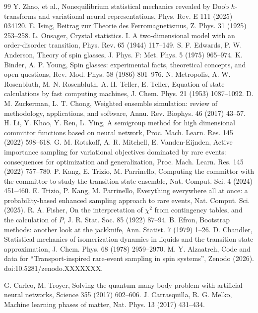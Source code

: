 \documentclass[a4paper,fleqn]{cas-sc}
\begin{document}
\begin{thebibliography}{99}
 Y. Zhao, et al., Nonequilibrium statistical mechanics revealed by Doob
$h$-transforms and variational neural representations, Phys. Rev. E 111 (2025) 034120.
 E. Ising, Beitrag zur Theorie des Ferromagnetismus, Z. Phys. 31 (1925)
253--258.
 L. Onsager, Crystal statistics. I. A two-dimensional model with an
order-disorder transition, Phys. Rev. 65 (1944) 117--149.
 S. F. Edwards, P. W. Anderson, Theory of spin glasses, J. Phys. F: Met.
Phys. 5 (1975) 965--974.
 K. Binder, A. P. Young, Spin glasses: experimental facts, theoretical
concepts, and open questions, Rev. Mod. Phys. 58 (1986) 801--976.
 N. Metropolis, A. W. Rosenbluth, M. N. Rosenbluth, A. H. Teller,
E. Teller, Equation of state calculations by fast computing machines, J. Chem. Phys. 21 (1953)
1087--1092.
 D. M. Zuckerman, L. T. Chong, Weighted ensemble simulation: review of
methodology, applications, and software, Annu. Rev. Biophys. 46 (2017) 43--57.
 H. Li, Y. Khoo, Y. Ren, L. Ying, A semigroup method for high dimensional committor
functions based on neural network, Proc. Mach. Learn. Res. 145 (2022) 598--618.
 G. M. Rotskoff, A. R. Mitchell, E. Vanden-Eijnden, Active importance
sampling for variational objectives dominated by rare events: consequences for optimization and
generalization, Proc. Mach. Learn. Res. 145 (2022) 757--780.
 P. Kang, E. Trizio, M. Parrinello, Computing the committor with the committor to
study the transition state ensemble, Nat. Comput. Sci. 4 (2024) 451--460.
 E. Trizio, P. Kang, M. Parrinello, Everything everywhere all at once: a
probability-based enhanced sampling approach to rare events, Nat. Comput. Sci. (2025).
 R. A. Fisher, On the interpretation of $\chi^2$ from contingency tables,
and the calculation of $P$, J. R. Stat. Soc. 85 (1922) 87--94.
 B. Efron, Bootstrap methods: another look at the jackknife, Ann. Statist.
7 (1979) 1--26.
 D. Chandler, Statistical mechanics of isomerization dynamics in liquids and
the transition state approximation, J. Chem. Phys. 68 (1978) 2959--2970.
 M. Y. Alzaatreh, Code and data for ``Transport-inspired rare-event sampling in
spin systems'', Zenodo (2026). doi:10.5281/zenodo.XXXXXXX.

 G. Carleo, M. Troyer, Solving the quantum many-body problem with artificial
neural networks, Science 355 (2017) 602--606.
 J. Carrasquilla, R. G. Melko, Machine learning phases of matter,
Nat. Phys. 13 (2017) 431--434.
\end{thebibliography}
\end{document}
